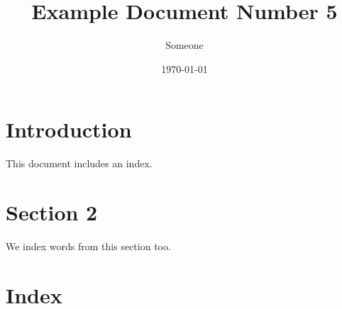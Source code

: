 \documentclass[11pt]{article}
\title{Example Document Number 5}
\author{Someone}
\date{\today}
\begin{document}
\maketitle
\section{Introduction}
This document includes an index.

\section{Section 2}
We index words from this section too.

\section{Index}
\printindex
\end{document}
